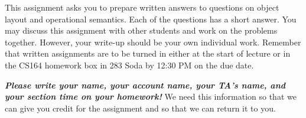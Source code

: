 \documentclass{article}
\begin{document}
\newcommand{\ttmath}[1]{$\mathtt{#1}$}


This assignment asks you to prepare written answers to questions on
object layout and operational semantics.
Each of the questions has a short answer. You
may discuss this assignment with other students and work on the
problems together.  However, your write-up should be your own
individual work.  Remember that written assignments are to be turned
in either at the start of lecture or in the CS164 homework box in 283
Soda by 12:30 PM on the due date.

\medskip

{\bf\em Please write your name, your account name, your TA's name, and
your section time on your homework!}  We need this information so that we
can give you credit for the assignment and so that we can return it to
you.

\bigskip
\end{document}
